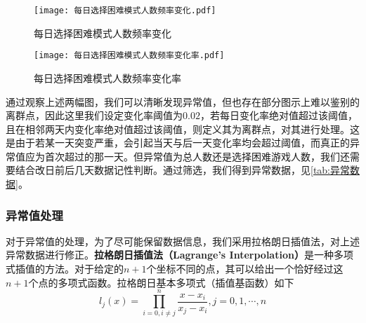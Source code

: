\documentclass{MathModeling}
\begin{document}
	\begin{figure}[H]
		\centering
		\begin{minipage}{0.48\linewidth}
			\centering
			\texttt{[image: 每日选择困难模式人数频率变化.pdf]}
			\caption{每日选择困难模式人数频率变化}
			\label{fig:每日选择困难模式人数频率变化}
		\end{minipage}
		\begin{minipage}{0.48\linewidth}
			\centering
			\texttt{[image: 每日选择困难模式人数频率变化率.pdf]}
			\caption{每日选择困难模式人数频率变化率}
			\label{fig:每日选择困难模式人数频率变化率}
		\end{minipage}
	\end{figure}
	通过观察上述两幅图，我们可以清晰发现异常值，但也存在部分图示上难以鉴别的离群点，因此这里我们设定变化率阈值为$0.02$，若每日变化率绝对值超过该阈值，且在相邻两天内变化率绝对值超过该阈值，则定义其为离群点，对其进行处理。这是由于若某一天突变严重，会引起当天与后一天变化率均会超过阈值，而真正的异常值应为首次超过的那一天。但异常值为总人数还是选择困难游戏人数，我们还需要结合改日前后几天数据记性判断。通过筛选，我们得到异常数据，见\textcolor{blue}{\cref{tab:异常数据}}。
\begin{table}[H]
	\centering
	\caption{异常数据分析}
	\label{tab:异常数据}
\end{table}

	\subsubsection{异常值处理}
对于异常值的处理，为了尽可能保留数据信息，我们采用拉格朗日插值法，对上述异常数据进行修正。\textbf{拉格朗日插值法（Lagrange's Interpolation）}是一种多项式插值的方法。对于给定的$n+1$个坐标不同的点，其可以给出一个恰好经过这$n+1$个点的多项式函数。拉格朗日基本多项式（插值基函数）如下
\begin{equation}
	l_{j}\left(x\right)=\prod_{i=0,i\neq j}^{n}\frac{x-x_{i}}{x_{j}-x_{i}},j=0,1,\cdots,n
\end{equation}
\end{document}
